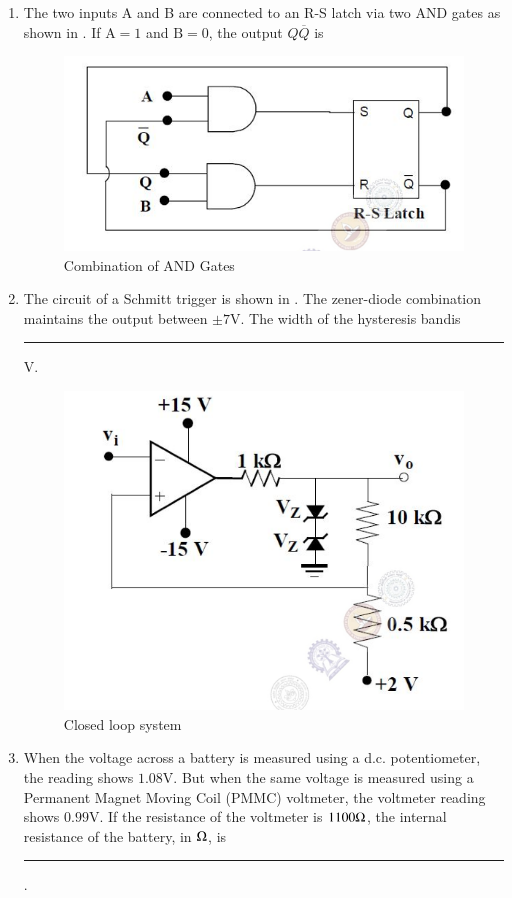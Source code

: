 \documentclass[journal,12pt,onecolumn]{IEEEtran}
\theoremstyle{remark}
\begin{document}
\begin{enumerate}
\item The two inputs A and B are connected to an R-S latch via two AND gates as shown in . If $\text{A}=1$ and $\text{B}=0$, the output $Q\overline{Q}$ is \par \hfill{}
\begin{figure}[H]
    \centering
    \includegraphics[width=0.5\columnwidth]{Figs/Q-43.png}
    \caption{Combination of AND Gates}
    \label{fig:placeholder_21}
\end{figure}
\begin{enumerate}
\end{enumerate}

\item The circuit of a Schmitt trigger is shown in . The zener-diode combination maintains the output between $\pm 7\text{V}$. The width of the hysteresis bandis \rule{1.5cm}{0.4pt} $\text{V}$. \par \hfill{}
\begin{figure}[H]
    \centering
    \includegraphics[width=0.5\columnwidth]{Figs/Q-44.png}
    \caption{Closed loop system}
    \label{f-21}
\end{figure}

\item When the voltage across a battery is measured using a d.c. potentiometer, the reading
shows $1.08 \text{V}$. But when the same voltage is measured using a Permanent Magnet Moving
Coil (PMMC) voltmeter, the voltmeter reading shows $0.99 \text{V}$. If the resistance of the
voltmeter is $1100 \ohm$, the internal resistance of the battery, in $\ohm$, is \rule{1.5cm}{0.4pt}. \par \hfill{}


\end{enumerate}
\end{document}

